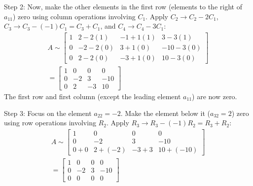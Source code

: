 \documentclass{article}
\begin{document}
Step 2: Now, make the other elements in the first row (elements to the right of $a_{11}$) zero using column operations involving $C_1$.
Apply $C_2 \to C_2 - 2C_1$, $C_3 \to C_3 - (-1)C_1 = C_3 + C_1$, and $C_4 \to C_4 - 3C_1$:
\begin{align*} A \sim \begin{bmatrix} 1 & 2 - 2(1) & -1 + 1(1) & 3 - 3(1) \\ 0 & -2 - 2(0) & 3 + 1(0) & -10 - 3(0) \\ 0 & 2 - 2(0) & -3 + 1(0) & 10 - 3(0) \end{bmatrix} \\ = \begin{bmatrix} 1 & 0 & 0 & 0 \\ 0 & -2 & 3 & -10 \\ 0 & 2 & -3 & 10 \end{bmatrix}\end{align*}
The first row and first column (except the leading element $a_{11}$) are now zero.

Step 3: Focus on the element $a_{22} = -2$. Make the element below it ($a_{32}=2$) zero using row operations involving $R_2$.
Apply $R_3 \to R_3 - (-1)R_2 = R_3 + R_2$:
\begin{align*} A \sim \begin{bmatrix} 1 & 0 & 0 & 0 \\ 0 & -2 & 3 & -10 \\ 0 + 0 & 2 + (-2) & -3 + 3 & 10 + (-10) \end{bmatrix} \\ = \begin{bmatrix} 1 & 0 & 0 & 0 \\ 0 & -2 & 3 & -10 \\ 0 & 0 & 0 & 0 \end{bmatrix}\end{align*}
\end{document}
